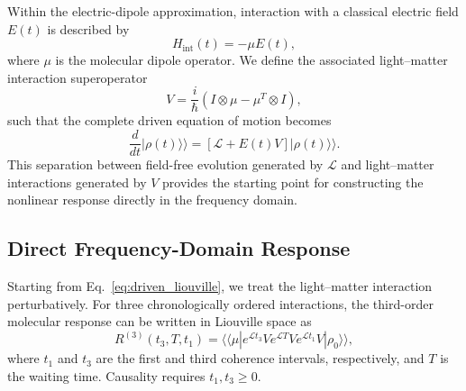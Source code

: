 Within the electric-dipole approximation, interaction with a classical
electric field $E(t)$ is described by
%
\begin{equation}
H_{\mathrm{int}}(t)
=
-\mu E(t),
\label{eq:dipole_interaction}
\end{equation}
%
where $\mu$ is the molecular dipole operator. We define the associated
light--matter interaction superoperator
%
\begin{equation}
V
=
\frac{i}{\hbar}
\left(
I\otimes\mu
-
\mu^{T}\otimes I
\right),
\label{eq:interaction_superoperator}
\end{equation}
%
such that the complete driven equation of motion becomes
%
\begin{equation}
\frac{d}{dt}
|\rho(t)\rangle\rangle
=
\left[
\mathcal{L}
+
E(t)V
\right]
|\rho(t)\rangle\rangle .
\label{eq:driven_liouville}
\end{equation}
%
This separation between field-free evolution generated by
$\mathcal{L}$ and light--matter interactions generated by $V$ provides
the starting point for constructing the nonlinear response directly
in the frequency domain.

\subsection{Direct Frequency-Domain Response}
\label{sec:direct_frequency}

Starting from Eq.~\eqref{eq:driven_liouville}, we treat the
light--matter interaction perturbatively. For three chronologically
ordered interactions, the third-order molecular response can be written
in Liouville space as
%
\begin{equation}
R^{(3)}(t_3,T,t_1)
=
\langle\!\langle \mu |
e^{\mathcal{L}t_3}
V
e^{\mathcal{L}T}
V
e^{\mathcal{L}t_1}
V
|\rho_0\rangle\!\rangle ,
\label{eq:third_order_time}
\end{equation}
%
where $t_1$ and $t_3$ are the first and third coherence intervals,
respectively, and $T$ is the waiting time. Causality requires
$t_1,t_3\geq 0$.

